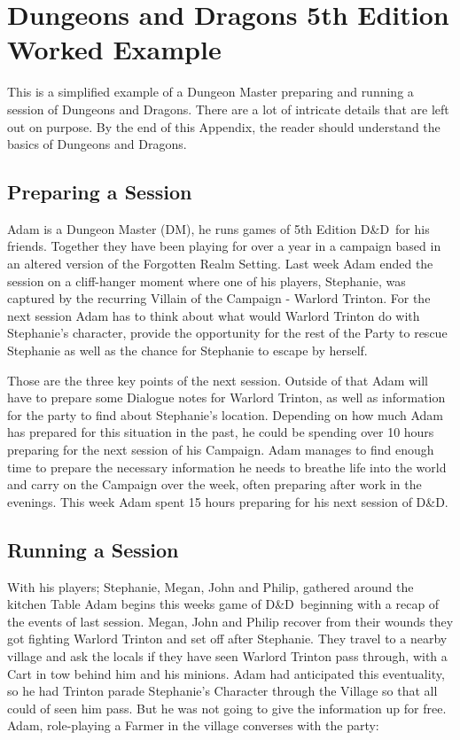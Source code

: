 \documentclass[review]{cmpreport}
\newcommand{\dnd}{D\&D}
\begin{document}
	\section{Dungeons and Dragons 5th Edition Worked Example} \label{DnDExample}
	This is a simplified example of a Dungeon Master preparing and running a session of Dungeons and Dragons. There are a lot of intricate details that are left out on purpose. By the end of this Appendix, the reader should understand the basics of Dungeons and Dragons. 
	
	\subsection{Preparing a Session} \label{DnDPrepExample}
	Adam is a Dungeon Master (DM), he runs games of 5th Edition \dnd \ for his friends. Together they have been playing for over a year in a campaign based in an altered version of the Forgotten Realm Setting. Last week Adam ended the session on a cliff-hanger moment where one of his players, Stephanie, was captured by the recurring Villain of the Campaign - Warlord Trinton. For the next session Adam has to think about what would Warlord Trinton do with Stephanie's character, provide the opportunity for the rest of the Party to rescue Stephanie as well as the chance for Stephanie to escape by herself.
	
	Those are the three key points of the next session. Outside of that Adam will have to prepare some Dialogue notes for Warlord Trinton, as well as information for the party to find about Stephanie's location. Depending on how much Adam has prepared for this situation in the past, he could be spending over 10 hours preparing for the next session of his Campaign. Adam manages to find enough time to prepare the necessary information he needs to breathe life into the world and carry on the Campaign over the week, often preparing after work in the evenings. This week Adam spent 15 hours preparing for his next session of \dnd. 
	
	\subsection{Running a Session} \label{DnDSeshExample}
	With his players; Stephanie, Megan, John and Philip, gathered around the kitchen Table Adam begins this weeks game of \dnd \ beginning with a recap of the events of last session. Megan, John and Philip recover from their wounds they got fighting Warlord Trinton and set off after Stephanie. They travel to a nearby village and ask the locals if they have seen Warlord Trinton pass through, with a Cart in tow behind him and his minions. Adam had anticipated this eventuality, so he had Trinton parade Stephanie's Character through the Village so that all could of seen him pass. But he was not going to give the information up for free. Adam, role-playing a Farmer in the village converses with the party:
	
\end{document}
